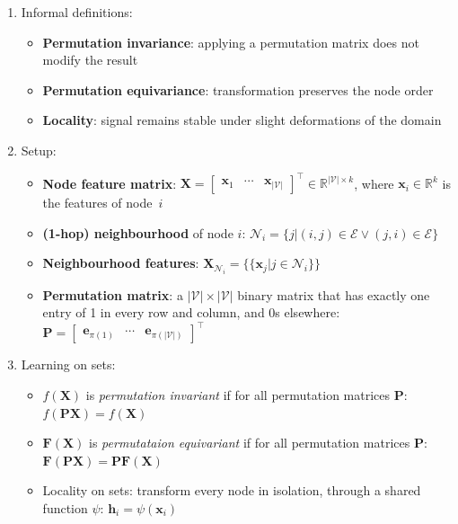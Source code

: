 \documentclass{article}
\begin{document}
\begin{enumerate}
	\item Informal definitions:
	\begin{itemize}[topsep=0pt]
		\item \textbf{Permutation invariance}: applying a permutation matrix does not modify the result
		\item \textbf{Permutation equivariance}: transformation preserves the node order
		\item \textbf{Locality}: signal remains stable under slight deformations of the domain
	\end{itemize}

	\item Setup:
	\begin{itemize}[topsep=0pt]
		\item \textbf{Node feature matrix}: $\mathbf{X}=\begin{bmatrix}
			\mathbf{x}_1 & \cdots & \mathbf{x}_{|\mathcal{V}|}
		\end{bmatrix}^\top\in\mathbb{R}^{|\mathcal{V}|\times k}$, where $\mathbf{x}_i\in\mathbb{R}^k$ is the features of node~$i$
		\item \textbf{(1-hop) neighbourhood} of node $i$: $\mathcal{N}_i=\big\{j\big|(i,j)\in\mathcal{E}\vee(j,i)\in\mathcal{E}\big\}$
		\item \textbf{Neighbourhood features}: $\mathbf{X}_{\mathcal{N}_i}=\{\!\{\mathbf{x}_j|j\in\mathcal{N}_i\}\!\}$
		\item \textbf{Permutation matrix}: a $|\mathcal{V}|\times|\mathcal{V}|$ binary matrix that has exactly one entry of 1 in every row and column, and 0s elsewhere: $\mathbf{P}=\begin{bmatrix}
			\mathbf{e}_{\pi(1)} & \cdots & \mathbf{e}_{\pi(|\mathcal{V}|)}
		\end{bmatrix}^\top$
	\end{itemize}

	\item Learning on sets:
	\begin{itemize}[topsep=0pt]
		\item $f(\mathbf{X})$ is \textit{permutation invariant} if for all permutation matrices $\mathbf{P}$: $f(\mathbf{PX})=f(\mathbf{X})$
		\item $\bm{F}(\mathbf{X})$ is \textit{permutataion equivariant} if for all permutation matrices $\mathbf{P}$: $\bm{F}(\mathbf{PX})=\mathbf{P}\bm{F}(\mathbf{X})$ 
		\item Locality on sets: transform every node in isolation, through a shared function $\psi$: $\mathbf{h}_i=\psi(\mathbf{x}_i)$
		

\end{itemize}
\end{enumerate}
\end{document}
